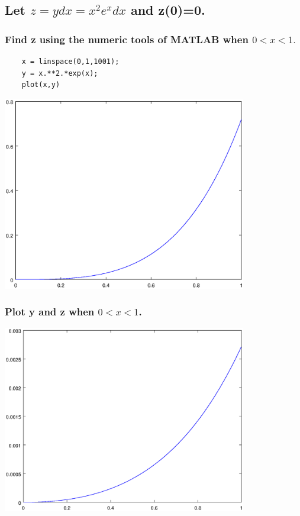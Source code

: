 \documentclass[12pt,a4paper]{article}
\begin{document}
\subsection{Let $z=ydx=x^2e^xdx$ and z(0)=0.}

\subsubsection{Find z using the numeric tools of MATLAB when $0 < x < 1.$} 
\begin{lstlisting}
	x = linspace(0,1,1001);
	y = x.**2.*exp(x);
	plot(x,y)
\end{lstlisting}

\includegraphics[width=0.8\textwidth]{2.eps}
\subsubsection{Plot y and z when $0 < x < 1$.}

\includegraphics[width=0.8\textwidth]{2-2.eps}
\end{document}
